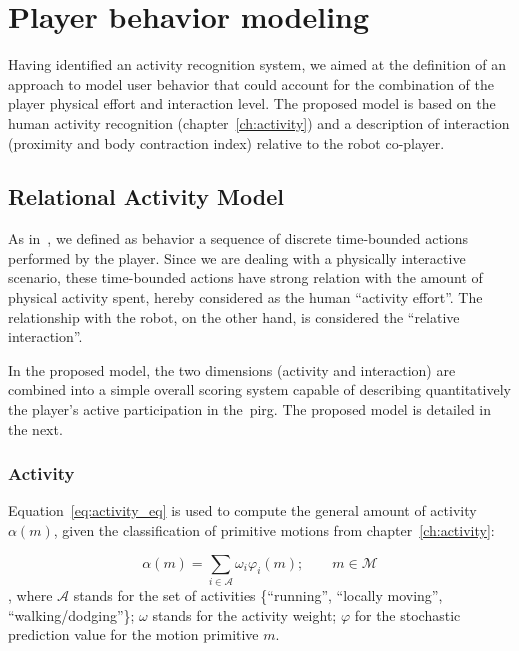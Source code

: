 \chapter{Player behavior modeling}\label{ch:modeling}

Having identified an activity recognition system, we aimed at the definition of an approach to model user behavior that could account for the combination of the player physical effort and interaction level. The proposed model is based on the human activity recognition (chapter~\ref{ch:activity}) and a description of interaction (proximity and body contraction index) relative to the robot co-player.

\section{Relational Activity Model}\label{sec:simple_model}

As in~\cite{etheredge_generic_2013}, we defined as behavior a sequence of discrete time-bounded actions performed by the player. Since we are dealing with a physically interactive scenario, these time-bounded actions have strong relation with the amount of physical activity spent, hereby considered as the human ``activity effort''. The relationship with the robot, on the other hand, is considered the ``relative interaction''. 

In the proposed model, the two dimensions (activity and interaction) are combined into a simple overall scoring system capable of describing quantitatively the player's active participation in the~\gls{pirg}. The proposed model is detailed in the next.

\subsection{Activity}\label{activity}

Equation~\ref{eq:activity_eq} is used to compute the general amount of activity $\alpha(m)$, given the classification of primitive motions from chapter~\ref{ch:activity}:

\begin{equation}
	\alpha(m)=\sum_{i \in \mathcal{A}} \omega_{i}\varphi_i(m);\qquad m \in \mathcal{M}
	\label{eq:activity_eq}
\end{equation}
, where $\mathcal{A}$ stands for the set of activities \{``running'', ``locally moving'', ``walking/dodging''\}; $\omega$ stands for the activity weight; $\varphi$ for the stochastic prediction value for the motion primitive $m$.

